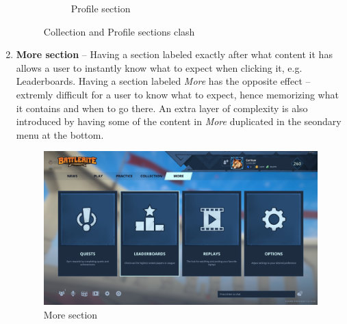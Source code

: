 \documentclass[a4paper,12pt]{article}
\begin{document}
\begin{enumerate}[label=\textbf{\arabic*})]
\begin{figure}[h!]
\begin{subfigure}[b]{0.45\linewidth}
            \caption{Profile section}
        \end{subfigure}
        \caption{Collection and Profile sections clash}
        \label{fig:play_vs_practice}
    \end{figure}
    
    \newpage
    \item \textbf{More section} -- Having a section labeled exactly after what content it has allows a user to instantly know what to expect when clicking it, e.g. Leaderboards. Having a section labeled \textit{More} has the opposite effect -- extremly difficult for a user to know what to expect, hence memorizing what it contains and when to go there. An extra layer of complexity is also introduced by having some of the content in \textit{More} duplicated in the seondary menu at the bottom.
    \begin{figure}[h!]
        \includegraphics[width=0.45\linewidth]{res/current/more.png}
        \centering
        \caption{More section}
    \end{figure}
    

\end{enumerate}
\end{document}

